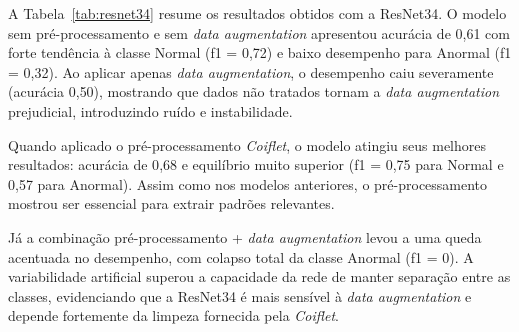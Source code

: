 A Tabela~\ref{tab:resnet34} resume os resultados obtidos com a ResNet34. O modelo sem pré-processamento e sem \textit{data augmentation} apresentou acurácia de 0{,}61 com forte tendência à classe Normal (f1 = 0{,}72) e baixo desempenho para Anormal (f1 = 0{,}32). Ao aplicar apenas \textit{data augmentation}, o desempenho caiu severamente (acurácia 0{,}50), mostrando que dados não tratados tornam a \textit{data augmentation} prejudicial, introduzindo ruído e instabilidade.

Quando aplicado o pré-processamento \textit{Coiflet}, o modelo atingiu seus melhores resultados: acurácia de 0{,}68 e equilíbrio muito superior (f1 = 0{,}75 para Normal e 0{,}57 para Anormal). Assim como nos modelos anteriores, o pré-processamento mostrou ser essencial para extrair padrões relevantes.

Já a combinação pré-processamento + \textit{data augmentation} levou a uma queda acentuada no desempenho, com colapso total da classe Anormal (f1 = 0). A variabilidade artificial superou a capacidade da rede de manter separação entre as classes, evidenciando que a ResNet34 é mais sensível à \textit{data augmentation} e depende fortemente da limpeza fornecida pela \textit{Coiflet}.

\begin{table}[!h]
\centering
\caption{Resultados da ResNet34 sob diferentes configurações}
\label{tab:resnet34}
\renewcommand{\arraystretch}{1.2}
\fonteproprioautor
\end{table}


